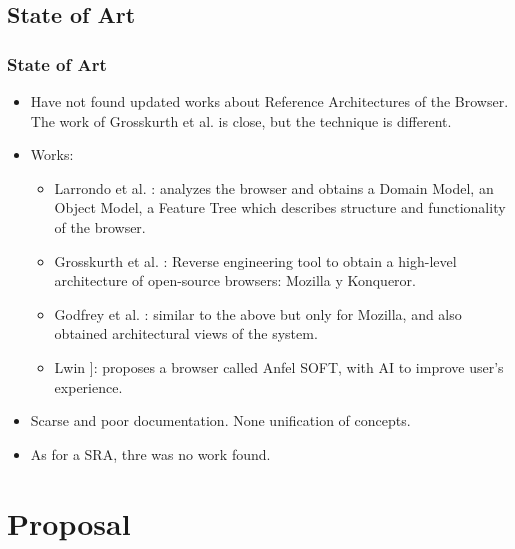 \documentclass[serif,9pt]{beamer}
\begin{document}
\subsection{State of Art}
\begin{frame}
	\frametitle{State of Art}
	\begin{itemize}
		\item<1-> Have not found updated works about Reference Architectures of the Browser. The work of Grosskurth et al. \cite{preprint-grosskurth-browser-archevol} is close, but the technique is different.
		\item<1-> Works: 
		\begin{itemize}
			\item<2> Larrondo et al. \cite{535061}: analyzes the browser and obtains a Domain Model,  an Object Model, a Feature Tree which describes structure and functionality of the browser.
			\item<3> Grosskurth et al. \cite{2005-grosskurth-browser-refarch,preprint-grosskurth-browser-archevol}: Reverse engineering tool to obtain a high-level architecture of open-source browsers: Mozilla y Konqueror.
			\item<4> Godfrey et al. \cite{Godfrey2000}: similar to the above but only for Mozilla, and also obtained architectural views of the system.
			\item<5> Lwin \cite{Lwin2009}]: proposes a browser called Anfel SOFT, with AI to improve user's experience.
		\end{itemize}
		\item<6-> Scarse and poor documentation. None unification of concepts.
		\item<7-> As for a SRA, thre was no work found.
	\end{itemize}
\end{frame}


\section{Proposal}
\end{document}
